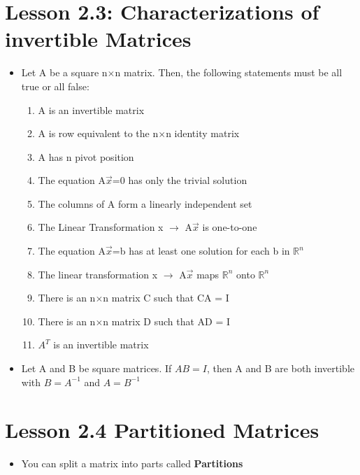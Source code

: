 \documentclass{report}
\newcommand{\Ax}{A$\vec{x}$}
\newcommand{\nxn}{n$\times$n}
\newcommand{\Rn}{$\mathbb{R}^n$}
\begin{document}
\section{Lesson 2.3: Characterizations of invertible Matrices}
	\begin{itemize}\addtolength{\leftskip}{2em}
		\item Let A be a square {\nxn} matrix. Then, the following statements must be all true or all false:
		\begin{enumerate}\addtolength{\leftskip}{4em}
		\item A is an invertible matrix
		\item A is row equivalent to the {\nxn} identity matrix
		\item A has n pivot position
		\item The equation {\Ax}=0 has only the trivial solution
		\item The columns of A form a linearly independent set
		\item The Linear Transformation x $\rightarrow$ {\Ax} is one-to-one
		\item The equation {\Ax}=b has at least one solution for each b in {\Rn}
		\item The linear transformation x $\rightarrow$ {\Ax} maps {\Rn} onto {\Rn} 
		\item There is an {\nxn} matrix C such that CA = I
		\item There is an {\nxn} matrix D such that AD = I
		\item $A^T$ is an invertible matrix
		\end{enumerate}
		\item Let A and B be square matrices. If $AB = I$, then A and B are both invertible with $B=A^{-1}$ and $A=B^{-1}$
	\end{itemize}
\section{Lesson 2.4 Partitioned Matrices}
	\begin{itemize}\addtolength{\leftskip}{2em}
		\item You can split a matrix into parts called \textbf{Partitions}
	\end{itemize}
\end{document}
